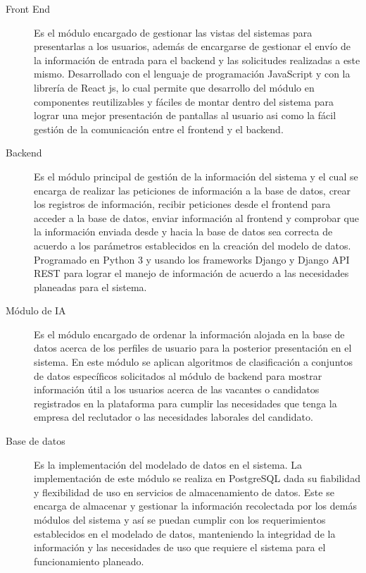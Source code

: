 \begin{description}
   \item[Front End]  Es el módulo encargado de gestionar las vistas del sistemas para presentarlas a los usuarios, además de encargarse de gestionar el envío de la información de entrada
   para el backend y las solicitudes realizadas a este mismo. Desarrollado con el lenguaje de programación JavaScript y con la librería de React js, lo cual permite
   que desarrollo del módulo en componentes reutilizables y fáciles de montar dentro del sistema para lograr una mejor presentación de pantallas al usuario asi como
   la fácil gestión de la comunicación entre el frontend y el backend.
   
   \item[Backend] Es el módulo principal de gestión de la información del sistema y el cual se encarga de realizar las peticiones de información a la base de datos, crear los registros
   de información, recibir peticiones desde el frontend para acceder a la base de datos, enviar información al frontend y comprobar que la información enviada desde y
   hacia la base de datos sea correcta de acuerdo a los parámetros establecidos en la creación del modelo de datos. Programado en Python 3 y usando los frameworks Django
   y Django API REST para lograr el manejo de información de acuerdo a las necesidades planeadas para el sistema.
   
   \item[Módulo de IA] Es el módulo encargado de ordenar la información alojada en la base de datos acerca de los perfiles de usuario para la posterior presentación en el sistema. En este
   módulo se aplican algoritmos de clasificación a conjuntos de datos específicos solicitados al módulo de backend para mostrar información útil a los usuarios acerca de
   las vacantes o candidatos registrados en la plataforma para cumplir las necesidades que tenga la empresa del reclutador o las necesidades laborales del candidato.
   
   
   \item[Base de datos] Es la implementación del modelado de datos en el sistema. La implementación de este módulo se realiza en PostgreSQL dada su fiabilidad y flexibilidad de uso en servicios
   de almacenamiento de datos. Este se encarga de almacenar y gestionar la información recolectada por los demás módulos del sistema y así se puedan cumplir con los
   requerimientos establecidos en el modelado de datos, manteniendo la integridad de la información y las necesidades de uso que requiere el sistema para el  funcionamiento
   planeado.
   
\end{description}